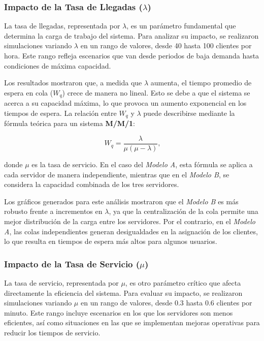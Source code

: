 \documentclass[a4paper,12pt]{article}
\begin{document}
\subsubsection{Impacto de la Tasa de Llegadas (\( \lambda \))}

La tasa de llegadas, representada por \( \lambda \), es un parámetro fundamental que determina la carga de trabajo del sistema. Para analizar su impacto, se realizaron simulaciones variando \( \lambda \) en un rango de valores, desde 40 hasta 100 clientes por hora. Este rango refleja escenarios que van desde periodos de baja demanda hasta condiciones de máxima capacidad.

Los resultados mostraron que, a medida que \( \lambda \) aumenta, el tiempo promedio de espera en cola (\( W_q \)) crece de manera no lineal. Esto se debe a que el sistema se acerca a su capacidad máxima, lo que provoca un aumento exponencial en los tiempos de espera. La relación entre \( W_q \) y \( \lambda \) puede describirse mediante la fórmula teórica para un sistema \textbf{M/M/1}:

\[\
W_q = \frac{\lambda}{\mu (\mu - \lambda)},
\]

donde \( \mu \) es la tasa de servicio. En el caso del \textit{Modelo A}, esta fórmula se aplica a cada servidor de manera independiente, mientras que en el \textit{Modelo B}, se considera la capacidad combinada de los tres servidores.

Los gráficos generados para este análisis mostraron que el \textit{Modelo B} es más robusto frente a incrementos en \( \lambda \), ya que la centralización de la cola permite una mejor distribución de la carga entre los servidores. Por el contrario, en el \textit{Modelo A}, las colas independientes generan desigualdades en la asignación de los clientes, lo que resulta en tiempos de espera más altos para algunos usuarios.

\subsubsection{Impacto de la Tasa de Servicio (\( \mu \))}

La tasa de servicio, representada por \( \mu \), es otro parámetro crítico que afecta directamente la eficiencia del sistema. Para evaluar su impacto, se realizaron simulaciones variando \( \mu \) en un rango de valores, desde 0.3 hasta 0.6 clientes por minuto. Este rango incluye escenarios en los que los servidores son menos eficientes, así como situaciones en las que se implementan mejoras operativas para reducir los tiempos de servicio.
\end{document}
